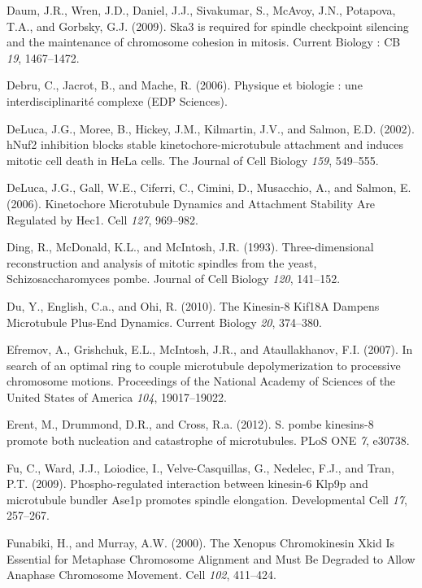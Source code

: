 \documentclass[12pt,a4paper,twoside,openright]{book}
\begin{document}
\hypertarget{ref-Daum2009}{}
Daum, J.R., Wren, J.D., Daniel, J.J., Sivakumar, S., McAvoy, J.N.,
Potapova, T.A., and Gorbsky, G.J. (2009). Ska3 is required for spindle
checkpoint silencing and the maintenance of chromosome cohesion in
mitosis. Current Biology : CB \emph{19}, 1467--1472.

\hypertarget{ref-Debru}{}
Debru, C., Jacrot, B., and Mache, R. (2006). Physique et biologie : une
interdisciplinarité complexe (EDP Sciences).

\hypertarget{ref-DeLuca2002}{}
DeLuca, J.G., Moree, B., Hickey, J.M., Kilmartin, J.V., and Salmon, E.D.
(2002). hNuf2 inhibition blocks stable kinetochore-microtubule
attachment and induces mitotic cell death in HeLa cells. The Journal of
Cell Biology \emph{159}, 549--555.

\hypertarget{ref-DeLuca2006}{}
DeLuca, J.G., Gall, W.E., Ciferri, C., Cimini, D., Musacchio, A., and
Salmon, E. (2006). Kinetochore Microtubule Dynamics and Attachment
Stability Are Regulated by Hec1. Cell \emph{127}, 969--982.

\hypertarget{ref-Ding1993a}{}
Ding, R., McDonald, K.L., and McIntosh, J.R. (1993). Three-dimensional
reconstruction and analysis of mitotic spindles from the yeast,
Schizosaccharomyces pombe. Journal of Cell Biology \emph{120}, 141--152.

\hypertarget{ref-Du2010}{}
Du, Y., English, C.a., and Ohi, R. (2010). The Kinesin-8 Kif18A Dampens
Microtubule Plus-End Dynamics. Current Biology \emph{20}, 374--380.

\hypertarget{ref-Efremov2007}{}
Efremov, A., Grishchuk, E.L., McIntosh, J.R., and Ataullakhanov, F.I.
(2007). In search of an optimal ring to couple microtubule
depolymerization to processive chromosome motions. Proceedings of the
National Academy of Sciences of the United States of America \emph{104},
19017--19022.

\hypertarget{ref-Erent2012}{}
Erent, M., Drummond, D.R., and Cross, R.a. (2012). S. pombe kinesins-8
promote both nucleation and catastrophe of microtubules. PLoS ONE
\emph{7}, e30738.

\hypertarget{ref-Fu2009}{}
Fu, C., Ward, J.J., Loiodice, I., Velve-Casquillas, G., Nedelec, F.J.,
and Tran, P.T. (2009). Phospho-regulated interaction between kinesin-6
Klp9p and microtubule bundler Ase1p promotes spindle elongation.
Developmental Cell \emph{17}, 257--267.

\hypertarget{ref-Funabiki2000}{}
Funabiki, H., and Murray, A.W. (2000). The Xenopus Chromokinesin Xkid Is
Essential for Metaphase Chromosome Alignment and Must Be Degraded to
Allow Anaphase Chromosome Movement. Cell \emph{102}, 411--424.
\end{document}
